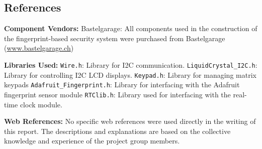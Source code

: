 \documentclass{article}
\begin{document}
\subsection{References}

\textbf{Component Vendors:}
\newline
Bastelgarage: All components used in the construction of the fingerprint-based security system were purchased from Bastelgarage (\href{https://www.bastelgarage.ch/}{www.bastelgarage.ch})

\textbf{Libraries Used:}
\newline
\texttt{Wire.h}: Library for I2C communication.
\newline
\texttt{LiquidCrystal\_I2C.h}: Library for controlling I2C LCD displays.
\newline
\texttt{Keypad.h}: Library for managing matrix keypads
\newline
\texttt{Adafruit\_Fingerprint.h}: Library for interfacing with the Adafruit fingerprint sensor module
\newline
\texttt{RTClib.h}: Library used for interfacing with the real-time clock module.

\textbf{Web References:}
\newline
No specific web references were used directly in the writing of this report. The descriptions and explanations are based on the collective knowledge and experience of the project group members.
\end{document}
